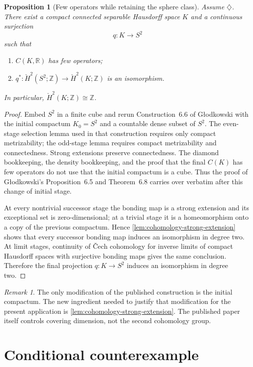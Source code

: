 \documentclass[11pt]{article}
\newtheorem{proposition}[theorem]{Proposition}
\theoremstyle{definition}
\theoremstyle{remark}
\newtheorem{remark}[theorem]{Remark}
\newcommand{\R}{\mathbb R}
\newcommand{\Z}{\mathbb Z}
\newcommand{\Hcheck}{\check H}
\begin{document}
\begin{proposition}[Few operators while retaining the sphere class]\label{prop:diamond-K}
Assume $\diamondsuit$. There exist a compact connected separable Hausdorff space $K$ and a continuous surjection
\[
       q:K\longrightarrow S^2
\]
such that
\begin{enumerate}[label=(\roman*)]
\item $C(K,\R)$ has few operators;
\item $q^*:\Hcheck^2(S^2;\Z)\to\Hcheck^2(K;\Z)$ is an isomorphism.
\end{enumerate}
In particular, $\Hcheck^2(K;\Z)\cong\Z$.
\end{proposition}

\begin{proof}
Embed $S^2$ in a finite cube and rerun Construction~6.6 of G\l odkowski with the initial compactum $K_0=S^2$ and a countable dense subset of $S^2$. The even-stage selection lemma used in that construction requires only compact metrizability; the odd-stage lemma requires compact metrizability and connectedness. Strong extensions preserve connectedness. The diamond bookkeeping, the density bookkeeping, and the proof that the final $C(K)$ has few operators do not use that the initial compactum is a cube. Thus the proof of G\l odkowski's Proposition~6.5 and Theorem~6.8 carries over verbatim after this change of initial stage.

At every nontrivial successor stage the bonding map is a strong extension and its exceptional set is zero-dimensional; at a trivial stage it is a homeomorphism onto a copy of the previous compactum. Hence \cref{lem:cohomology-strong-extension} shows that every successor bonding map induces an isomorphism in degree two. At limit stages, continuity of \v Cech cohomology for inverse limits of compact Hausdorff spaces with surjective bonding maps \cite{Spanier} gives the same conclusion. Therefore the final projection $q:K\to S^2$ induces an isomorphism in degree two.
\end{proof}

\begin{remark}
The only modification of the published construction is the initial compactum. The new ingredient needed to justify that modification for the present application is \cref{lem:cohomology-strong-extension}. The published paper itself controls covering dimension, not the second cohomology group.
\end{remark}

\section{Conditional counterexample}\label{sec:conditional-counterexample}
\end{document}
